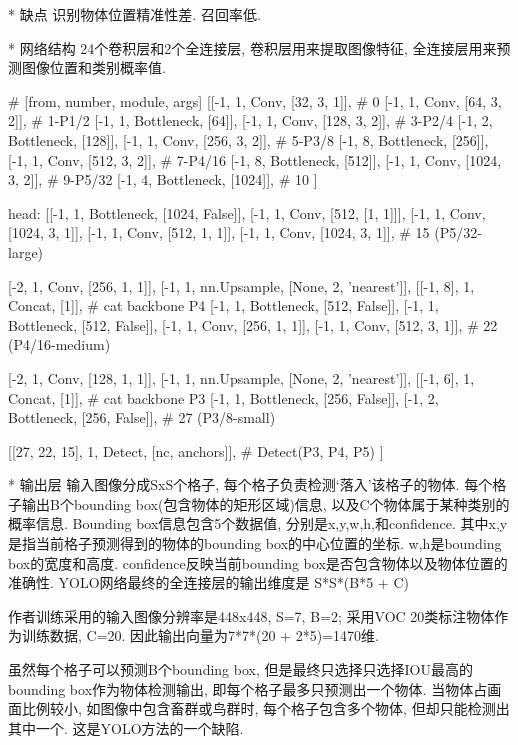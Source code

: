 				* 缺点
					识别物体位置精准性差. 召回率低. 

			* 网络结构
				24个卷积层和2个全连接层, 卷积层用来提取图像特征, 全连接层用来预测图像位置和类别概率值. 

				# [from, number, module, args]
				[[-1, 1, Conv, [32, 3, 1]],  # 0
				 [-1, 1, Conv, [64, 3, 2]],  # 1-P1/2
				 [-1, 1, Bottleneck, [64]],
				 [-1, 1, Conv, [128, 3, 2]],  # 3-P2/4
				 [-1, 2, Bottleneck, [128]],
				 [-1, 1, Conv, [256, 3, 2]],  # 5-P3/8
				 [-1, 8, Bottleneck, [256]],
				 [-1, 1, Conv, [512, 3, 2]],  # 7-P4/16
				 [-1, 8, Bottleneck, [512]],
				 [-1, 1, Conv, [1024, 3, 2]],  # 9-P5/32
				 [-1, 4, Bottleneck, [1024]],  # 10
				]

				head:
				[[-1, 1, Bottleneck, [1024, False]],
				 [-1, 1, Conv, [512, [1, 1]]],
				 [-1, 1, Conv, [1024, 3, 1]],
				 [-1, 1, Conv, [512, 1, 1]],
				 [-1, 1, Conv, [1024, 3, 1]],  # 15 (P5/32-large)
			  
				 [-2, 1, Conv, [256, 1, 1]],
				 [-1, 1, nn.Upsample, [None, 2, 'nearest']],
				 [[-1, 8], 1, Concat, [1]],  # cat backbone P4
				 [-1, 1, Bottleneck, [512, False]],
				 [-1, 1, Bottleneck, [512, False]],
				 [-1, 1, Conv, [256, 1, 1]],
				 [-1, 1, Conv, [512, 3, 1]],  # 22 (P4/16-medium)
			  
				 [-2, 1, Conv, [128, 1, 1]],
				 [-1, 1, nn.Upsample, [None, 2, 'nearest']],
				 [[-1, 6], 1, Concat, [1]],  # cat backbone P3
				 [-1, 1, Bottleneck, [256, False]],
				 [-1, 2, Bottleneck, [256, False]],  # 27 (P3/8-small)
			  
				 [[27, 22, 15], 1, Detect, [nc, anchors]],   # Detect(P3, P4, P5)
				]
			  

				* 输出层
					输入图像分成SxS个格子, 每个格子负责检测‘落入’该格子的物体. 每个格子输出B个bounding box(包含物体的矩形区域)信息, 以及C个物体属于某种类别的概率信息. Bounding box信息包含5个数据值, 分别是x,y,w,h,和confidence. 其中x,y是指当前格子预测得到的物体的bounding box的中心位置的坐标. w,h是bounding box的宽度和高度. confidence反映当前bounding box是否包含物体以及物体位置的准确性. YOLO网络最终的全连接层的输出维度是 S*S*(B*5 + C)

					作者训练采用的输入图像分辨率是448x448, S=7, B=2; 采用VOC 20类标注物体作为训练数据, C=20. 因此输出向量为7*7*(20 + 2*5)=1470维. 

					虽然每个格子可以预测B个bounding box, 但是最终只选择只选择IOU最高的bounding box作为物体检测输出, 即每个格子最多只预测出一个物体. 当物体占画面比例较小, 如图像中包含畜群或鸟群时, 每个格子包含多个物体, 但却只能检测出其中一个. 这是YOLO方法的一个缺陷. 

